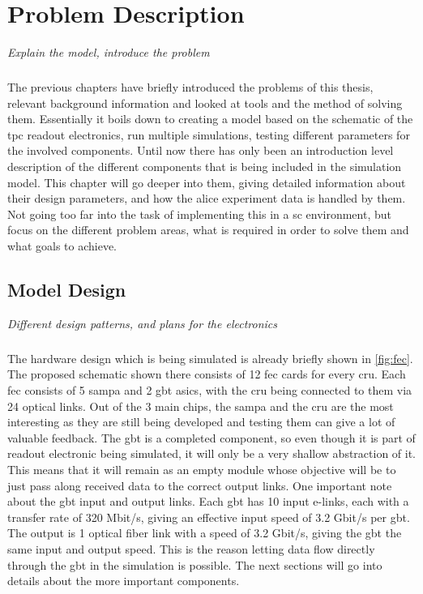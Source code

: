 \documentclass[a4paper, 12pt]{report}\dfrac{\right }{•}
\begin{document}
\chapter{Problem Description}
\textit{Explain the model, introduce the problem}
\label{cha:4}

\paragraph{}
The previous chapters have briefly introduced the problems of this thesis, relevant background information and looked at tools and the method of solving them.
Essentially it boils down to creating a model based on the schematic of the \gls{tpc} readout electronics, run multiple simulations, testing different parameters for the involved components.
Until now there has only been an introduction level description of the different components that is being included in the simulation model.
This chapter will go deeper into them, giving detailed information about their design parameters, and how the \gls{alice} experiment data is handled by them.
Not going too far into the task of implementing this in a \gls{sc} environment, but focus on the different problem areas, what is required in order to solve them and what goals to achieve.

\section{Model Design}
\textit{Different design patterns, and plans for the electronics}
\paragraph{}
The hardware design which is being simulated is already briefly shown in \ref{fig:fec}.
The proposed schematic shown there consists of 12 \gls{fec} cards for every \gls{cru}.
Each \gls{fec} consists of 5 \gls{sampa} and 2 \gls{gbt} \glspl{asic}, with the \gls{cru} being connected to them via 24 optical links.
Out of the 3 main chips, the \gls{sampa} and the \gls{cru} are the most interesting as they are still being developed and testing them can give a lot of valuable feedback.
The \gls{gbt} is a completed component, so even though it is part of readout electronic being simulated, it will only be a very shallow abstraction of it.
This means that it will remain as an empty module whose objective will be to just pass along received data to the correct output links.
One important note about the \gls{gbt} input and output links.
Each \gls{gbt} has 10 input e-links, each with a transfer rate of 320 Mbit/s, giving an effective input speed of 3.2 Gbit/s per \gls{gbt}.
The output is 1 optical fiber link with a speed of 3.2 Gbit/s, giving the \gls{gbt} the same input and output speed.
This is the reason letting data flow directly through the \gls{gbt} in the simulation is possible.
The next sections will go into details about the more important components.
\end{document}
